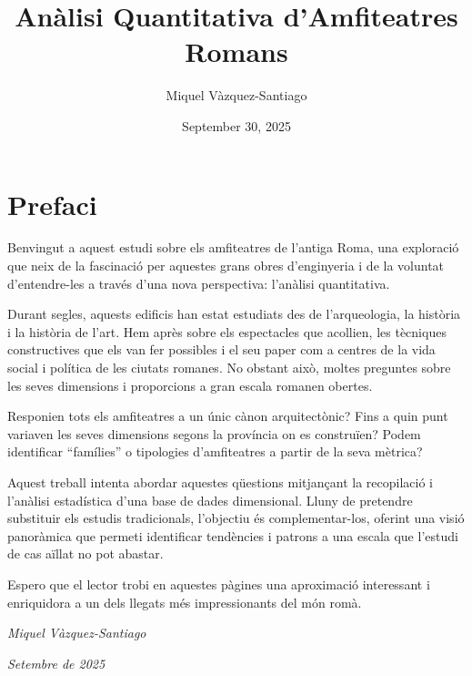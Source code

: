 \documentclass[
  12pt,
  letterpaper,
  DIV=11,
  numbers=noendperiod]{scrreprt}
\title{Anàlisi Quantitativa d'Amfiteatres Romans}
\author{Miquel Vàzquez-Santiago}
\date{September 30, 2025}
\renewcommand*\contentsname{Table of contents}
\newcommand\contentsname{Table of contents}
\begin{document}
\maketitle

\renewcommand*\contentsname{Table of contents}
{
\hypersetup{linkcolor=}
\setcounter{tocdepth}{2}
\tableofcontents
}


\chapter*{Prefaci}\label{prefaci}


Benvingut a aquest estudi sobre els amfiteatres de l'antiga Roma, una
exploració que neix de la fascinació per aquestes grans obres
d'enginyeria i de la voluntat d'entendre-les a través d'una nova
perspectiva: l'anàlisi quantitativa.

Durant segles, aquests edificis han estat estudiats des de
l'arqueologia, la història i la història de l'art. Hem après sobre els
espectacles que acollien, les tècniques constructives que els van fer
possibles i el seu paper com a centres de la vida social i política de
les ciutats romanes. No obstant això, moltes preguntes sobre les seves
dimensions i proporcions a gran escala romanen obertes.

Responien tots els amfiteatres a un únic cànon arquitectònic? Fins a
quin punt variaven les seves dimensions segons la província on es
construïen? Podem identificar ``famílies'' o tipologies d'amfiteatres a
partir de la seva mètrica?

Aquest treball intenta abordar aquestes qüestions mitjançant la
recopilació i l'anàlisi estadística d'una base de dades dimensional.
Lluny de pretendre substituir els estudis tradicionals, l'objectiu és
complementar-los, oferint una visió panoràmica que permeti identificar
tendències i patrons a una escala que l'estudi de cas aïllat no pot
abastar.

Espero que el lector trobi en aquestes pàgines una aproximació
interessant i enriquidora a un dels llegats més impressionants del món
romà.

\emph{Miquel Vàzquez-Santiago}

\emph{Setembre de 2025}
\end{document}
